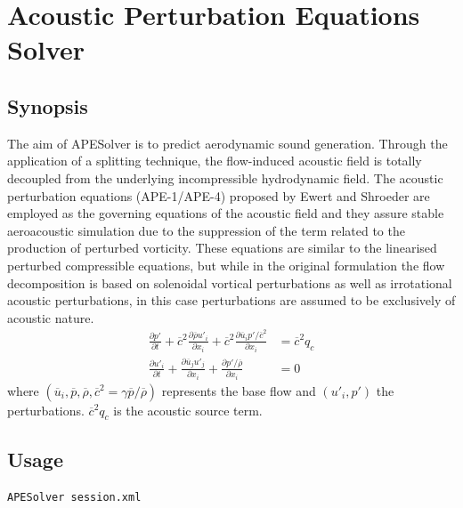 \chapter{Acoustic Perturbation Equations Solver}

\newcommand{\dd}[2]{\frac{\partial #1}{\partial #2}}

\section{Synopsis}
The aim of APESolver is to predict aerodynamic sound generation. Through
the application of a splitting technique, the flow-induced acoustic field is
totally decoupled from the underlying incompressible hydrodynamic field. The
acoustic perturbation equations (APE-1/APE-4) proposed by Ewert and Shroeder are employed as
the governing equations of the acoustic field and they assure stable
aeroacoustic simulation due to the suppression of the term related to the
production of perturbed vorticity. These equations are similar to the linearised
perturbed compressible equations, but while in the original formulation the flow
decomposition is based on solenoidal vortical perturbations as well as
irrotational acoustic perturbations, in this case perturbations are assumed to
be exclusively of acoustic nature.
\begin{subequations}
    \begin{align*}
	\frac{\partial p'}{\partial t}
	+ \overline{c}^2 \frac{\partial \overline{\rho} u'_i}{\partial x_i}
	+ \overline{c}^2 \frac{\partial \overline{u}_i p' / \overline{c}^2}{\partial x_i}
	&= \overline{c}^2 q_c
	\\
	\frac{\partial u'_i}{\partial t}
	+ \frac{\partial \overline{u}_j u'_j}{\partial x_i}
	+ \frac{\partial p' / \overline{\rho}}{\partial x_i}
	&= 0
	\end{align*}
\end{subequations}
where $(\overline{u}_i,\overline{p}, \overline{\rho}, \overline{c}^2 = \gamma \overline{p} / \overline{\rho} )$ represents the base flow and $(u'_i,p')$ the perturbations.
$\overline{c}^2 q_c$ is the acoustic source term.

\section{Usage}
\begin{lstlisting}[style=BashInputStyle]
APESolver session.xml
\end{lstlisting}

